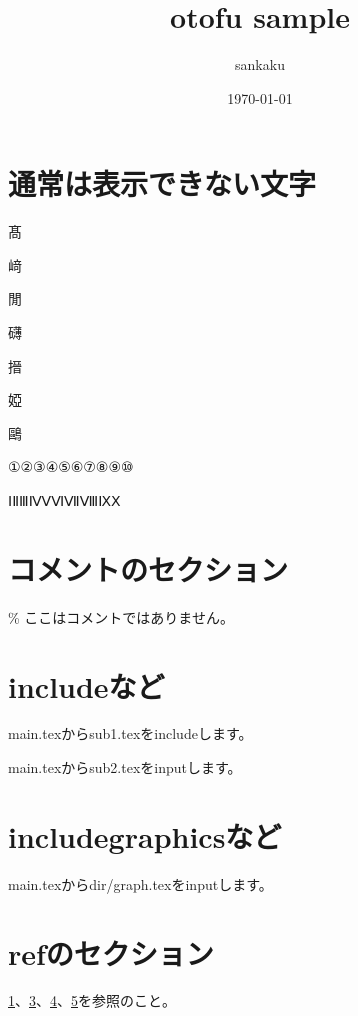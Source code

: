 \documentclass[a4paper,10pt]{jsarticle}
\author{sankaku}
\date{\today}
\title{otofu sample}
\begin{document}
\maketitle

\section{通常は表示できない文字}
\label{通常は変換できない文字のセクション}

髙

﨑

閒

礴

搢

婭

鷗

①②③④⑤⑥⑦⑧⑨⑩

ⅠⅡⅢⅣⅤⅥⅦⅧⅨⅩ

\section{コメントのセクション}
\label{コメントのセクション}



\% ここはコメントではありません。%


\section{includeなど}
\label{includeなどのセクション}

main.texからsub1.texをincludeします。



main.texからsub2.texをinputします。



\section{includegraphicsなど}
\label{includegraphicsなどのセクション}


main.texからdir/graph.texをinputします。



\section{refのセクション}
\label{refのセクション}

\ref{通常は変換できない文字のセクション}、\ref{includeなどのセクション}、\ref{includegraphicsなどのセクション}、\ref{refのセクション}を参照のこと。
\end{document}
